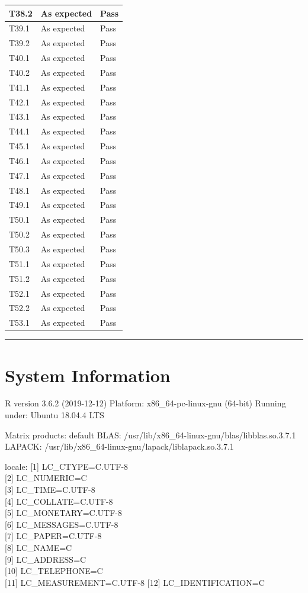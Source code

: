 \documentclass[]{article}
\begin{document}
\begin{longtable}{l|l|l}
\hline
T38.2 & As expected & Pass\\
\hline
T39.1 & As expected & Pass\\
\hline
T39.2 & As expected & Pass\\
\hline
T40.1 & As expected & Pass\\
\hline
T40.2 & As expected & Pass\\
\hline
T41.1 & As expected & Pass\\
\hline
T42.1 & As expected & Pass\\
\hline
T43.1 & As expected & Pass\\
\hline
T44.1 & As expected & Pass\\
\hline
T45.1 & As expected & Pass\\
\hline
T46.1 & As expected & Pass\\
\hline
T47.1 & As expected & Pass\\
\hline
T48.1 & As expected & Pass\\
\hline
T49.1 & As expected & Pass\\
\hline
T50.1 & As expected & Pass\\
\hline
T50.2 & As expected & Pass\\
\hline
T50.3 & As expected & Pass\\
\hline
T51.1 & As expected & Pass\\
\hline
T51.2 & As expected & Pass\\
\hline
T52.1 & As expected & Pass\\
\hline
T52.2 & As expected & Pass\\
\hline
T53.1 & As expected & Pass\\
\hline
\end{longtable}

\begin{center}\rule{0.5\linewidth}{0.5pt}\end{center}

\hypertarget{system-information}{%
\section{System Information}\label{system-information}}

R version 3.6.2 (2019-12-12) Platform: x86\_64-pc-linux-gnu (64-bit)
Running under: Ubuntu 18.04.4 LTS

Matrix products: default BLAS:
/usr/lib/x86\_64-linux-gnu/blas/libblas.so.3.7.1 LAPACK:
/usr/lib/x86\_64-linux-gnu/lapack/liblapack.so.3.7.1

locale: {[}1{]} LC\_CTYPE=C.UTF-8\\
{[}2{]} LC\_NUMERIC=C\\
{[}3{]} LC\_TIME=C.UTF-8\\
{[}4{]} LC\_COLLATE=C.UTF-8\\
{[}5{]} LC\_MONETARY=C.UTF-8\\
{[}6{]} LC\_MESSAGES=C.UTF-8\\
{[}7{]} LC\_PAPER=C.UTF-8\\
{[}8{]} LC\_NAME=C\\
{[}9{]} LC\_ADDRESS=C\\
{[}10{]} LC\_TELEPHONE=C\\
{[}11{]} LC\_MEASUREMENT=C.UTF-8 {[}12{]} LC\_IDENTIFICATION=C
\end{document}
